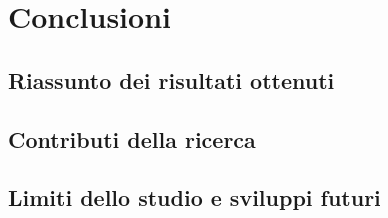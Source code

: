 \chapter{Conclusioni}\label{chap:conclusions}
\section{Riassunto dei risultati ottenuti}
\section{Contributi della ricerca}
\section{Limiti dello studio e sviluppi futuri}